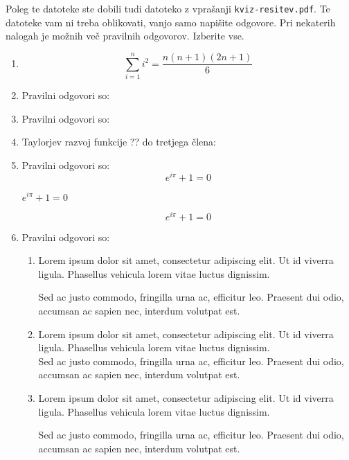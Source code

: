 \documentclass[11pt]{article}
\begin{document}
Poleg te datoteke ste dobili tudi datoteko z vprašanji \texttt{kviz-resitev.pdf}.
Te datoteke vam ni treba oblikovati, vanjo samo napišite odgovore.
Pri nekaterih nalogah je možnih več pravilnih odgovorov. Izberite vse.

\begin{enumerate}
    \item \[\sum_{i=1}^{n} i^2 = \frac{n(n + 1)(2n + 1)}{6}\] %

    \item Pravilni odgovori so: %
    
    \item Pravilni odgovori so: %
    
    \item Taylorjev razvoj funkcije ?? do tretjega člena:

    \item Pravilni odgovori so:  %
      \[ e^{i \pi} + 1 = 0 \]
      \begin{center}
          \( e^{i \pi} + 1 = 0 \)
      \end{center}
      \begin{equation*}
          e^{i \pi} + 1 = 0
      \end{equation*}

    \item Pravilni odgovori so: %
        \begin{enumerate}
            \item {
                Lorem ipsum dolor sit amet, consectetur adipiscing elit. Ut id viverra ligula. Phasellus vehicula lorem vitae luctus dignissim. 
                
                Sed ac justo commodo, fringilla urna ac, efficitur leo. Praesent dui odio, accumsan ac sapien nec, interdum volutpat est. 
            }
            \item {
                Lorem ipsum dolor sit amet, consectetur adipiscing elit. Ut id viverra ligula. Phasellus vehicula lorem vitae luctus dignissim. \\
                Sed ac justo commodo, fringilla urna ac, efficitur leo. Praesent dui odio, accumsan ac sapien nec, interdum volutpat est. 
            }
            \item {
                Lorem ipsum dolor sit amet, consectetur adipiscing elit. Ut id viverra ligula. Phasellus vehicula lorem vitae luctus dignissim. \par
                Sed ac justo commodo, fringilla urna ac, efficitur leo. Praesent dui odio, accumsan ac sapien nec, interdum volutpat est. 
            }
        \end{enumerate}
    

\end{enumerate}
\end{document}
